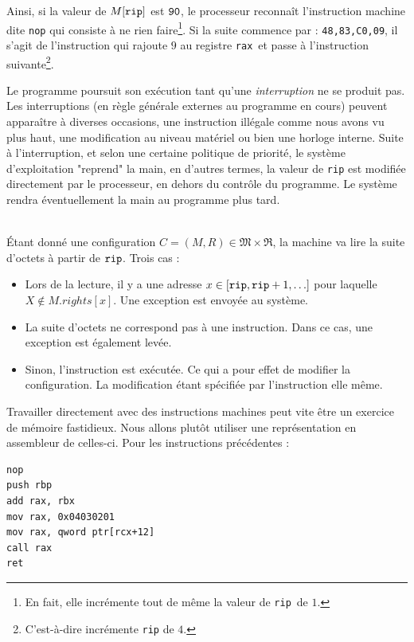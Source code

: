 \documentclass{book}
\newenvironment{formalisme}[1]{%
	\def\FrameCommand{\fboxrule=\FrameRule\fboxsep=\FrameSep \fcolorbox{red!10}{red!5}}%
	\MakeFramed {\advance\hsize-\width \FrameRestore}
	\noindent {\bf #1}\\
}%
{\endMakeFramed}
\newcommand{\code}[1]{\texttt{#1}}
\newcommand{\rip}{{\tt rip}\xspace}
\newcommand{\rax}{{\tt rax}\xspace}
\newcommand{\hexa}[1]{{\tt #1}}
\newcommand{\vReg}{{\mathfrak{R}}}
\newcommand{\Memory}{{\mathfrak{M}}}
\begin{document}
Ainsi, si la valeur de  $M[\rip]$ est $\hexa{90}$, le processeur reconnaît l'instruction machine dite \code{nop} qui consiste à ne rien faire\footnote{En fait, elle incrémente tout de même la valeur de \rip\ de $1$. }. Si la suite commence par : \code{48,83,C0,09},  il s'agit de l'instruction qui rajoute $9$ au registre \rax\ et passe à l'instruction suivante\footnote{C'est-à-dire incrémente \rip de $4$.}.  

Le programme  poursuit son exécution tant qu'une \emph{interruption} ne se produit pas. Les interruptions (en règle générale externes au programme en cours) peuvent apparaître à diverses occasions, une instruction illégale comme nous avons vu plus haut, une modification au niveau matériel ou bien une horloge interne. Suite à l'interruption, et selon une certaine politique de priorité, le système d'exploitation "reprend" la main, en d'autres termes, la valeur de \rip est modifiée directement par le processeur, en dehors du contrôle du programme. Le système rendra éventuellement la main au programme plus tard. 

\begin{formalisme}{Exécution}
\'Etant donné une configuration $C = (M, R) \in \Memory \times \vReg$, la machine va lire la suite d'octets à partir de $\rip$. Trois cas : 
\begin{itemize}
	\item Lors de la lecture, il y a une adresse $x \in [\rip, \rip+1, \ldots]$ pour laquelle $X \not\in M.rights[x]$. Une exception est envoyée au système. 
	\item La suite d'octets ne correspond pas à une instruction. Dans ce cas, une exception est également levée. 
	\item Sinon, l'instruction est exécutée. Ce qui a pour effet de modifier la configuration. La modification étant spécifiée par l'instruction elle même.
\end{itemize}
\end{formalisme}

Travailler directement avec des instructions machines peut vite être un exercice de mémoire fastidieux. Nous allons plutôt utiliser une représentation en assembleur de celles-ci. Pour les instructions précédentes : 
\begin{verbatim}
nop
push rbp
add rax, rbx
mov rax, 0x04030201
mov rax, qword ptr[rcx+12]
call rax
ret
\end{verbatim}
\end{document}
